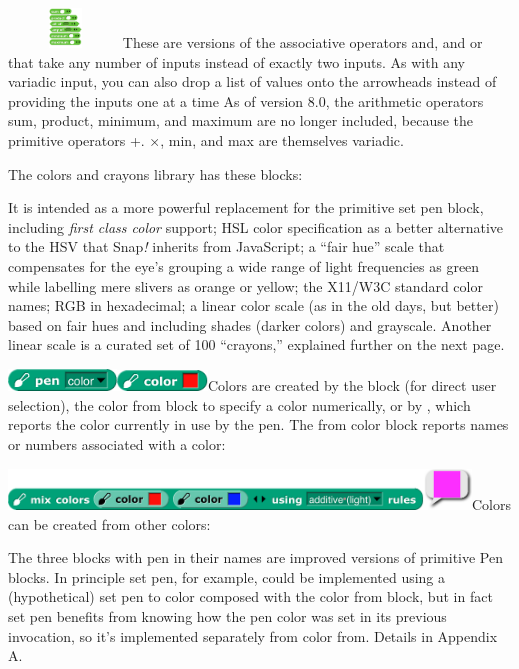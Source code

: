 \includegraphics[width=1.19653in,height=0.41667in]{media/image398.png}These
are versions of the associative operators and, and or that take any
number of inputs instead of exactly two inputs. As with any variadic
input, you can also drop a list of values onto the arrowheads instead of
providing the inputs one at a time As of version 8.0, the arithmetic
operators sum, product, minimum, and maximum are no longer included,
because the primitive operators +. ×, min, and max are themselves
variadic.

The colors and crayons library has these blocks:

It is intended as a more powerful replacement for the primitive set pen
block, including \emph{first class color} support; HSL color
specification as a better alternative to the HSV that Snap\emph{!}
inherits from JavaScript; a ``fair hue'' scale that compensates for the
eye's grouping a wide range of light frequencies as green while
labelling mere slivers as orange or yellow; the X11/W3C standard color
names; RGB in hexadecimal; a linear color scale (as in the old days, but
better) based on fair hues and including shades (darker colors) and
grayscale. Another linear scale is a curated set of 100 ``crayons,''
explained further on the next page.

\includegraphics[width=1.13333in,height=0.23333in]{media/image413.png}\includegraphics[width=0.95in,height=0.225in]{media/image414.png}Colors
are created by the block (for direct user selection), the color from
block to specify a color numerically, or by , which reports the color
currently in use by the pen. The from color block reports names or
numbers associated with a color:

\includegraphics[width=4.83333in,height=0.43056in]{media/image415.png}Colors
can be created from other colors:

The three blocks with pen in their names are improved versions of
primitive Pen blocks. In principle set pen, for example, could be
implemented using a (hypothetical) set pen to color composed with the
color from block, but in fact set pen benefits from knowing how the pen
color was set in its previous invocation, so it's implemented separately
from color from. Details in Appendix A.

